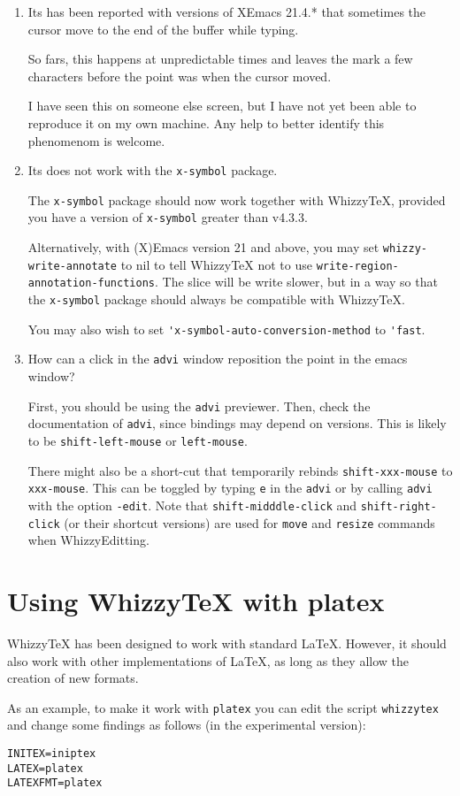 \documentclass{article}
\let \lst \verb
\begin{document}
\begin {enumerate}

\item
Its has been reported with versions of \textsf{XEmacs 21.4.*}
that sometimes the cursor move to the end of the buffer while typing.

So fars, this happens at unpredictable times and leaves the mark a few
characters before the point was when the cursor moved. 

I have seen this on someone else screen, but I have not yet been able to
reproduce it on my own machine. Any help to better identify this phenomenom
is welcome. 


\item Its does not work with the  \lst"x-symbol" package.

The  \lst"x-symbol" package should now work together with WhizzyTeX, 
provided you have a version of {\tt x-symbol} greater than v4.3.3. 

Alternatively, with (X)Emacs version 21 and above, you may set
\lst"whizzy-write-annotate" to nil to tell WhizzyTeX not to use
\lst"write-region-annotation-functions". The slice will be write slower, but
in a way so that the \lst"x-symbol" package should always be compatible with 
WhizzyTeX. 

You may also wish to set \lst"'x-symbol-auto-conversion-method" to
\lst"'fast".

\item How can a click in the \lst"advi" window reposition the point
in the emacs window?

First, you should be using the \lst"advi" previewer.  Then, check the
documentation of \lst"advi", since bindings may depend on versions. This is
likely to be \lst"shift-left-mouse" or \lst"left-mouse".

There might also be a short-cut that temporarily rebinds
\lst"shift-xxx-mouse" to \lst"xxx-mouse". This can be toggled by typing
\lst"e"   in the \lst"advi" or by calling \lst"advi" with the option
\lst"-edit". 
%
Note that \lst"shift-midddle-click" and \lst"shift-right-click" (or their
shortcut versions) are used for \lst"move" and \lst"resize" commands when
WhizzyEditting.


\end {enumerate}


\section {Using WhizzyTeX with platex}

WhizzyTeX has been designed to work with standard LaTeX.
However, it should also work  with other implementations of LaTeX, as long
as they allow the creation of new formats. 

As an example, to make it work with \lst"platex" you can edit 
the script \lst"whizzytex" and change some findings as follows
(in the experimental version): 
\begin{verbatim}
INITEX=iniptex
LATEX=platex
LATEXFMT=platex
\end{verbatim}
\end{document}
